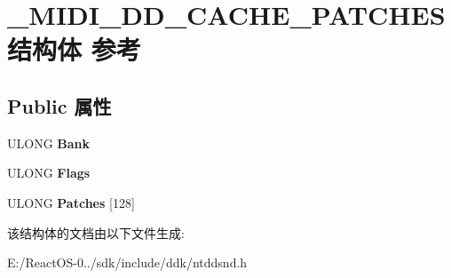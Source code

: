 \hypertarget{struct___m_i_d_i___d_d___c_a_c_h_e___p_a_t_c_h_e_s}{}\section{\+\_\+\+M\+I\+D\+I\+\_\+\+D\+D\+\_\+\+C\+A\+C\+H\+E\+\_\+\+P\+A\+T\+C\+H\+E\+S结构体 参考}
\label{struct___m_i_d_i___d_d___c_a_c_h_e___p_a_t_c_h_e_s}
\subsection*{Public 属性}
\begin{DoxyCompactItemize}
\item 
\mbox{\label{struct___m_i_d_i___d_d___c_a_c_h_e___p_a_t_c_h_e_s_add35a7e310f11e2718ab330d0880c241}} 
U\+L\+O\+NG {\bfseries Bank}
\item 
\mbox{\label{struct___m_i_d_i___d_d___c_a_c_h_e___p_a_t_c_h_e_s_a8327113ff186512aee979f0409c9d7fd}} 
U\+L\+O\+NG {\bfseries Flags}
\item 
\mbox{\label{struct___m_i_d_i___d_d___c_a_c_h_e___p_a_t_c_h_e_s_ab1d9d0fff2177962e97afd1f22fe58b2}} 
U\+L\+O\+NG {\bfseries Patches} \mbox{[}128\mbox{]}
\end{DoxyCompactItemize}


该结构体的文档由以下文件生成\+:\begin{DoxyCompactItemize}
\item 
E\+:/\+React\+O\+S-\/0../sdk/include/ddk/ntddsnd.\+h\end{DoxyCompactItemize}
